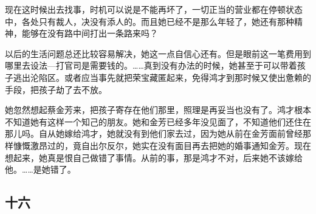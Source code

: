 \par 现在这时候出去找事，时机可以说是不能再坏了，一切正当的营业都在停顿状态中，各处只有裁人，决没有添人的。而且她已经不是那么年轻了，她还有那种精神，能够在没有路中间打出一条路来吗？
\par 以后的生活问题总还比较容易解决，她这一点自信心还有。但是眼前这一笔费用到哪里去设法—打官司是需要钱的。……真到没有办法的时候，她甚至于可以带着孩子逃出沦陷区。或者应当事先就把荣宝藏匿起来，免得鸿才到那时候又使出惫赖的手段，把孩子劫了去不放。
\par 她忽然想起蔡金芳来，把孩子寄存在他们那里，照理是再妥当也没有了。鸿才根本不知道她有这样一个知己的朋友。她和金芳已经多年没见面了，不知道他们还住在那儿吗。自从她嫁给鸿才，她就没有到他们家去过，因为她从前在金芳面前曾经那样慷慨激昂过的，竟自出尔反尔，她实在没有面目再去把她的婚事通知金芳。现在想起来，她真是恨自己做错了事情。从前的事，那是鸿才不对，后来她不该嫁给他。……是她错了。


\subsection{十六}

